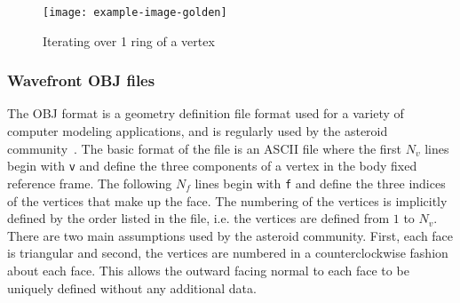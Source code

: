 \begin{figure}
    \centering
    \texttt{[image: example-image-golden]}
    \caption{Iterating over 1 ring of a vertex}
\end{figure}

\subsubsection{Wavefront OBJ files}
The OBJ format is a geometry definition file format used for a variety of computer modeling applications, and is regularly used by the asteroid community~\cite{neese2004}.
The basic format of the file is an ASCII file where the first \( N_v\) lines begin with \texttt{v} and define the three components of a vertex in the body fixed reference frame.
The following \( N_f\) lines begin with \texttt{f} and define the three indices of the vertices that make up the face.
The numbering of the vertices is implicitly defined by the order listed in the file, i.e. the vertices are defined from \( 1 \) to \( N_v\).
There are two main assumptions used by the asteroid community.
First, each face is triangular and second, the vertices are numbered in a counterclockwise fashion about each face.
This allows the outward facing normal to each face to be uniquely defined without any additional data.

